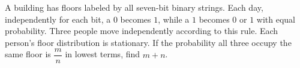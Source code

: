 A building has floors labeled by all seven-bit binary strings. Each day, independently for each bit, a $0$ becomes $1$, while a $1$ becomes $0$ or $1$ with equal probability. Three people move independently according to this rule. Each person's floor distribution is stationary. If the probability all three occupy the same floor is $\dfrac{m}{n}$ in lowest terms, find $m+n$.
